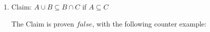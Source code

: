 \documentclass{article}
\begin{document}
\begin{enumerate}
\begin{enumerate}
\begin{proof}
\begin{align}
                &\quad \hspace{1cm} \text{Since } J \cap K \subseteq K \text{, we know } J \cap K \subseteq (H \cup K) \\
                &\quad \hspace{1cm} \text{Since } J \cap K \subseteq (H \cup K) \text{ and } J \nsubseteq M \text{, we know } J \cap K \subseteq (H \cup K) \setminus M \\
                &\quad \text{In either case of } H \cup (J \cap K) \text{, we proved that they were a subset of } (H \cup K) \setminus M \text{, } \\
                &\quad \text{so } H \cup (J \cap K) \subseteq (H \cup K) \setminus M
            \end{align}
        \end{proof}
    \end{enumerate}
    \item Claim: $A \cup B \subseteq B \cap C$ if $A \subseteq C$
    
    The Claim is proven $false$, with the following counter example:


\end{enumerate}
\end{document}

